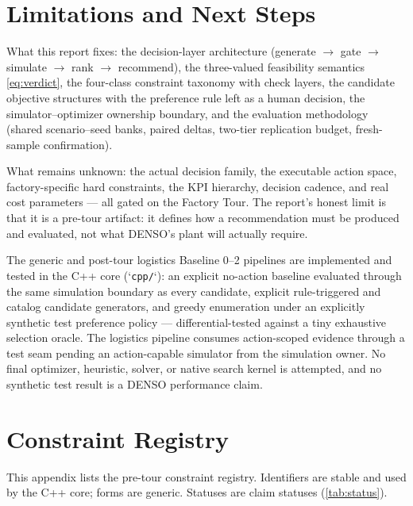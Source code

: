 \documentclass[11pt,a4paper]{article}
\begin{document}
\section{Limitations and Next Steps}\label{sec:limits}

What this report fixes: the decision-layer architecture (generate
$\rightarrow$ gate $\rightarrow$ simulate $\rightarrow$ rank $\rightarrow$
recommend), the three-valued feasibility semantics
\eqref{eq:verdict}, the four-class constraint taxonomy with check layers,
the candidate objective structures with the preference rule left as a human
decision, the simulator--optimizer ownership boundary, and the evaluation
methodology (shared scenario--seed banks, paired deltas, two-tier
replication budget, fresh-sample confirmation).

What remains unknown: the actual decision family, the executable action
space, factory-specific hard constraints, the KPI hierarchy, decision
cadence, and real cost parameters --- all gated on the Factory Tour. The
report's honest limit is that it is a pre-tour artifact: it defines how a
recommendation must be produced and evaluated, not what DENSO's plant will
actually require.

The generic and post-tour logistics Baseline 0--2 pipelines are implemented
and tested in the C++ core
(`\texttt{cpp/}`): an explicit no-action baseline evaluated through the
same simulation boundary as every candidate, explicit rule-triggered and
catalog candidate generators, and greedy enumeration under an explicitly
synthetic test preference policy --- differential-tested against a tiny
exhaustive selection oracle. The logistics pipeline consumes action-scoped evidence
through a test seam pending an action-capable simulator from the simulation
owner. No final optimizer, heuristic, solver, or native search kernel is
attempted, and no synthetic test result is a DENSO performance claim.

\appendix
\section{Constraint Registry}\label{sec:registry}

This appendix lists the pre-tour constraint registry. Identifiers are stable
and used by the C++ core; forms are generic. Statuses are claim statuses
(\cref{tab:status}).
\end{document}

